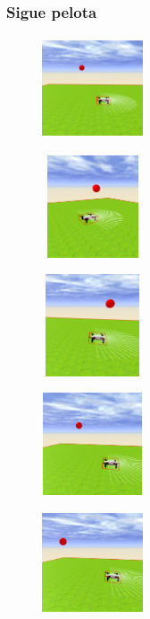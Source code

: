 \documentclass[xcolor={table}]{beamer}
\begin{document}
		\begin{frame}
			\frametitle{Sigue pelota}
			\begin{subfigure}{\textwidth}
              \includegraphics[width=3cm, height=3cm]{img/followBallTello2.png}
            \label{fig:figure2_2}
            \end{subfigure}\hfill
            \begin{subfigure}{\textwidth}
                \includegraphics[width=3cm, height=3cm]{img/followBallTello3.png}
            \label{fig:figure2_3}
            \end{subfigure}\hfill
            \begin{subfigure}{\textwidth}
                \includegraphics[width=3cm, height=3cm]{img/followBallTello4.png}
            \label{fig:figure2_4}
            \end{subfigure}
            \begin{subfigure}{\textwidth}
                \includegraphics[width=3cm, height=3cm]{img/followBallTello6.png}
            \label{fig:figure2_6}
            \end{subfigure}\hfill
            \begin{subfigure}{\textwidth}
                \includegraphics[width=3cm, height=3cm]{img/followBallTello7.png}

\end{subfigure}
\end{frame}
\end{document}
